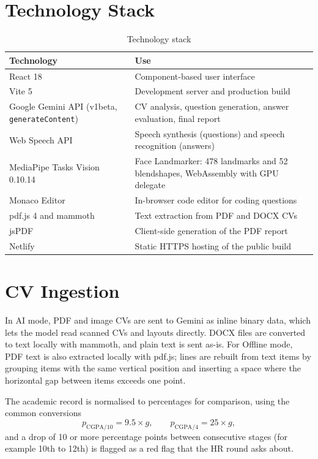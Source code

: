 \documentclass[12pt,a4paper,oneside]{report}
\begin{document}
\section{Technology Stack}
\begin{table}[H]
\centering
\caption{Technology stack}
\label{tab:stack}
\small
\begin{tabularx}{\textwidth}{@{}lY@{}}
\toprule
\textbf{Technology} & \textbf{Use} \\
\midrule
React 18 & Component-based user interface \\
Vite 5 & Development server and production build \\
Google Gemini API (v1beta, \texttt{generateContent}) & CV analysis, question generation, answer evaluation, final report \\
Web Speech API & Speech synthesis (questions) and speech recognition (answers) \\
MediaPipe Tasks Vision 0.10.14 & Face Landmarker: 478 landmarks and 52 blendshapes, WebAssembly with GPU delegate \\
Monaco Editor & In-browser code editor for coding questions \\
pdf.js 4 and mammoth & Text extraction from PDF and DOCX CVs \\
jsPDF & Client-side generation of the PDF report \\
Netlify & Static HTTPS hosting of the public build \\
\bottomrule
\end{tabularx}
\end{table}

\section{CV Ingestion}
In AI mode, PDF and image CVs are sent to Gemini as inline binary data, which lets the model read scanned CVs and layouts directly. DOCX files are converted to text locally with mammoth, and plain text is sent as-is. For Offline mode, PDF text is also extracted locally with pdf.js; lines are rebuilt from text items by grouping items with the same vertical position and inserting a space where the horizontal gap between items exceeds one point.

The academic record is normalised to percentages for comparison, using the common conversions
\begin{equation}
p_{\text{CGPA}/10} = 9.5 \times g, \qquad p_{\text{CGPA}/4} = 25 \times g,
\end{equation}
and a drop of 10 or more percentage points between consecutive stages (for example 10th to 12th) is flagged as a red flag that the HR round asks about.
\end{document}
